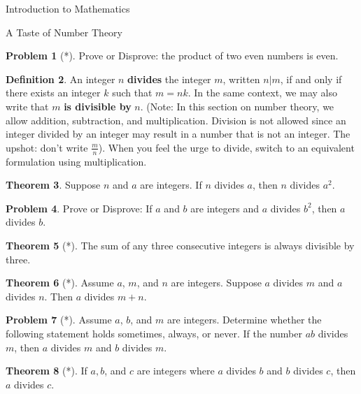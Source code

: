 \documentclass[11pt]{article}
\theoremstyle{definition}
\newtheorem{theorem}{Theorem}[section]
\newtheorem{definition}[theorem]{Definition}
\newtheorem{problem}[theorem]{Problem}
\begin{document}
\begin{section}{Introduction to Mathematics}
\begin{subsection}{A Taste of Number Theory}
\begin{problem}[*] Prove or Disprove: the product of two even numbers is even. \end{problem}

\begin{definition} An integer $n$ \textbf{divides} the integer $m$, written $n|m$, if and only if there exists an integer $k$ such that $m=nk$. In the same context, we may also write that $m$ \textbf{is divisible by} $n$.  (Note: In this section on number theory, we allow addition, subtraction, and multiplication.  Division is not allowed since an integer divided by an integer may result in a number that is not an integer. The upshot: don't write $\frac{m}{n}$).  When you feel the urge to divide, switch to an equivalent formulation using multiplication.  \end{definition}

\begin{theorem} Suppose $n$ and $a$ are integers.  If $n$ divides $a$, then $n$ divides $a^2$. \end{theorem}

\begin{problem} Prove or Disprove:  If $a$ and $b$ are integers and $a$ divides $b^2$, then $a$ divides $b$. \end{problem}

\begin{theorem}[*] The sum of any three consecutive integers is always divisible by three.\end{theorem}

\begin{theorem}[*] Assume $a$, $m$, and $n$ are integers. Suppose $a$ divides $m$ and $a$ divides $n$.  Then $a$ divides $m+n$.  \end{theorem}

\begin{problem}[*] Assume $a$, $b$, and $m$ are integers. Determine whether the following statement holds sometimes, always, or never.  If the number $ab$ divides $m$, then $a$ divides $m$ and $b$ divides $m$. \end{problem}



\begin{theorem}[*] If $a, b$, and $c$ are integers where $a$ divides $b$ and $b$ divides $c$, then $a$ divides $c$. \end{theorem}

\end{subsection}

\end{section}
\end{document}
